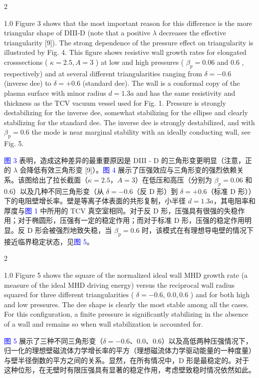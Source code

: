 \documentclass[utf8]{ctexart}
\newcommand\enzhbox[2]{
  	\quad\par \begin{paracol}{2} \colseprulecolor{black} 
  		\begin{spacing}{1.0}
  			\footnotesize  #1
  		\end{spacing}
  		\switchcolumn[1] 
  		#2
  	\end{paracol} \quad\par
  }
\begin{document}
\begin{sloppypar}
 
\enzhbox{  Figure 3 shows that the most important reason for this difference is the more triangular shape of DIII-D (note that a positive $\lambda$ decreases the effective triangularity \textcolor{green!50!black}{[9]}). The strong dependence of the pressure effect on triangularity is illustrated by Fig. 4. This figure shows resistive wall growth rates for elongated crosssections ( $\kappa=2.5, A=3$ ) at low and high pressures ( $\beta_{p}=0.06$ and 0.6 , respectively) and at several different triangularities ranging from $\delta=-0.6$ (inverse dee) to $\delta=+0.6$ (standard dee). The wall is a conformal copy of the plasma surface with minor radius $d=1.3 a$ and has the same resistivity and thickness as the TCV vacuum vessel used for Fig. 1. Pressure is strongly destabilizing for the inverse dee, somewhat stabilizing for the ellipse and clearly stabilizing for the standard dee. The inverse dee is strongly destabilized, and with $\beta_{\mathrm{p}}=0.6$ the mode is near marginal stability with an ideally conducting wall, see Fig. 5.}{
\textcolor{blue}{图 3} 表明，造成这种差异的最重要原因是 DIII - D 的三角形变更明显（注意，正的 $\lambda$ 会降低有效三角形变 \textcolor{green!50!black}{[9]}）。\textcolor{blue}{图 4} 展示了压强效应与三角形变的强烈依赖关系。该图给出了拉长截面（$\kappa = 2.5$，$A = 3$）在低压和高压（分别为 $\beta_{p}=0.06$ 和 0.6）以及几种不同三角形变（从 $\delta = - 0.6$（反 D 形）到 $\delta = + 0.6$（标准 D 形））下的电阻壁增长率。壁是等离子体表面的共形复制，小半径 $d = 1.3a$，其电阻率和厚度与\textcolor{blue}{图 1} 中所用的 TCV 真空室相同。对于反 D 形，压强具有很强的失稳作用；对于椭圆形，压强有一定的稳定作用；而对于标准 D 形，压强的稳定作用明显。反 D 形会被强烈地致失稳，当 $\beta_{\mathrm{p}} = 0.6$ 时，该模式在有理想导电壁的情况下接近临界稳定状态，见\textcolor{blue}{图 5}。 }
  
 
\enzhbox{  Figure 5 shows the square of the normalized ideal wall MHD growth rate (a measure of the ideal MHD driving energy) versus the reciprocal wall radius squared for three different triangularities ( $\delta=-0.6$, $0.0,0.6$ ) and for both high and low pressures. The dee shape is clearly the most stable among all the cases. For this configuration, a finite pressure is significantly stabilizing in the absence of a wall and remains so when wall stabilization is accounted for.}{
\textcolor{blue}{图 5} 展示了三种不同三角形变（$\delta = - 0.6$、$0.0$、$0.6$）以及高低两种压强情况下，归一化的理想壁磁流体力学增长率的平方（理想磁流体力学驱动能量的一种度量）与壁半径倒数的平方之间的关系。显然，在所有情况中，D 形是最稳定的。对于这种位形，在无壁时有限压强具有显著的稳定作用，考虑壁致稳时情况依然如此。 }
  

\end{sloppypar}
\end{document}
